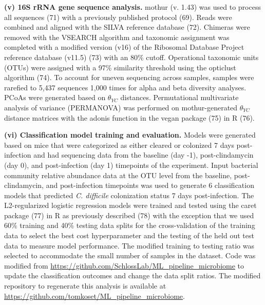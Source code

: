 \documentclass[
  11pt,
]{article}
\begin{document}
\textbf{(v) 16S rRNA gene sequence analysis.} mothur (v. 1.43) was used
to process all sequences (71) with a previously published protocol (69).
Reads were combined and aligned with the SILVA reference database (72).
Chimeras were removed with the VSEARCH algorithm and taxonomic
assignment was completed with a modified version (v16) of the Ribosomal
Database Project reference database (v11.5) (73) with an 80\% cutoff.
Operational taxonomic units (OTUs) were assigned with a 97\% similarity
threshold using the opticlust algorithm (74). To account for uneven
sequencing across samples, samples were rarefied to 5,437 sequences
1,000 times for alpha and beta diversity analyses. PCoAs were generated
based on \(\theta_{YC}\) distances. Permutational multivariate analysis
of variance (PERMANOVA) was performed on mothur-generated
\(\theta_{YC}\) distance matrices with the adonis function in the vegan
package (75) in R (76).

\textbf{(vi) Classification model training and evaluation.} Models were
generated based on mice that were categorized as either cleared or
colonized 7 days post-infection and had sequencing data from the
baseline (day -1), post-clindamycin (day 0), and post-infection (day 1)
timepoints of the experiment. Input bacterial community relative
abundance data at the OTU level from the baseline, post-clindamycin, and
post-infection timepoints was used to generate 6 classification models
that predicted \emph{C. difficile} colonization status 7 days
post-infection. The L2-regularized logistic regression models were
trained and tested using the caret package (77) in R as previously
described (78) with the exception that we used 60\% training and 40\%
testing data splits for the cross-validation of the training data to
select the best cost hyperparameter and the testing of the held out test
data to measure model performance. The modified training to testing
ratio was selected to accommodate the small number of samples in the
dataset. Code was modified from
\url{https://github.com/SchlossLab/ML_pipeline_microbiome} to update the
classification outcomes and change the data split ratios. The modified
repository to regenerate this analysis is available at
\url{https://github.com/tomkoset/ML_pipeline_microbiome}.
\end{document}

